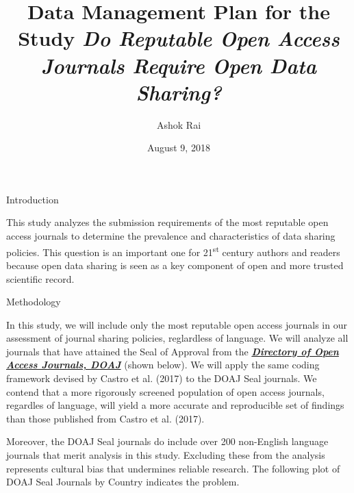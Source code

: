 \documentclass[ignorenonframetext,]{beamer}
\title{Data Management Plan for the Study \emph{Do Reputable Open Access
Journals Require Open Data Sharing?}}
\author{Ashok Rai}
\date{August 9, 2018}
\begin{document}
\frame{\titlepage}

\begin{frame}[fragile]{Introduction}

This study analyzes the submission requirements of the most reputable
open access journals to determine the prevalence and characteristics of
data sharing policies. This question is an important one for
21\textsuperscript{st} century authors and readers because open data
sharing is seen as a key component of open and more trusted scientific
record.


\begin{block}{Methodology}

In this study, we will include only the most reputable open access
journals in our assessment of journal sharing policies, reglardless of
language. We will analyze all journals that have attained the Seal of
Approval from the \href{http://doaj.org}{\emph{\textbf{Directory of Open
Access Journals, DOAJ}}} (shown below). We will apply the same coding
framework devised by Castro et al. (2017) to the DOAJ Seal journals. We
contend that a more rigorously screened population of open access
journals, regardles of language, will yield a more accurate and
reproducible set of findings than those published from Castro et al.
(2017).

Moreover, the DOAJ Seal journals do include over 200 non-English
language journals that merit analysis in this study. Excluding these
from the analysis represents cultural bias that undermines reliable
research. The following plot of DOAJ Seal Journals by Country indicates
the problem.


\end{block}
\end{frame}
\end{document}
